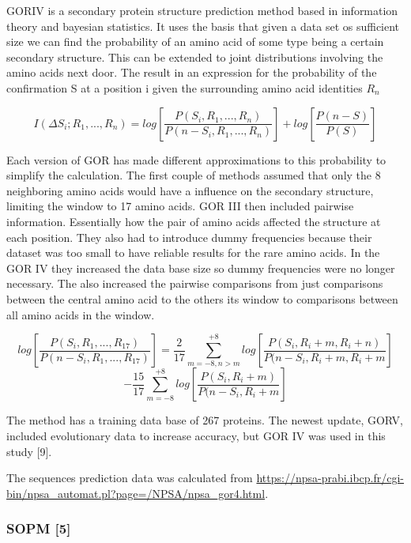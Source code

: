 \documentclass{article}
\begin{document}
GORIV is a secondary protein structure prediction method based in information theory and bayesian statistics. It uses the basis that given a data set os sufficient size we can find the probability of an amino acid of some type being a certain secondary structure. This can be extended to joint distributions involving the amino acids next door. The result in an expression for the probability of the confirmation S at a position i given the surrounding amino acid identities $R_n$

$$I(\Delta S_i ; R_1, ... , R_n) = log[\frac{P(S_i,R_1,...,R_n)}{P(n-S_i,R_1,...,R_n)}] + log[\frac{P(n-S)}{P(S)}]$$

Each version of GOR has made different approximations to this probability to simplify the calculation. The first couple of methods assumed that only the 8 neighboring amino acids would have a influence on the secondary structure, limiting the window to 17 amino acids. GOR III then included pairwise information. Essentially how the pair of amino acids affected the structure at each position. They also had to introduce dummy frequencies because their dataset was too small to have reliable results for the rare amino acids. In the GOR IV they increased the data base size so dummy frequencies were no longer necessary. The also increased the pairwise comparisons from just comparisons between the central amino acid to the others its window to comparisons between all amino acids in the window.

$$log[\frac{P(S_i,R_1,...,R_17)}{P(n-S_i,R_1,...,R_17)}] = \frac{2}{17}  \sum_{m=-8, n>m}^{+8}log[\frac{P(S_i,R_i+m,R_i+n)}{P(n-S_i,R_i+m,R_i+m}] $$
$$ -\frac{15}{17}  \sum_{m=-8}^{+8}log[\frac{P(S_i,R_i+m)}{P(n-S_i,R_i+m}]$$

The method has a training data base of 267 proteins. The newest update, GORV, included evolutionary data to increase accuracy, but GOR IV was used in this study [9].

The sequences prediction data was calculated from \url{https://npsa-prabi.ibcp.fr/cgi-bin/npsa_automat.pl?page=/NPSA/npsa_gor4.html}.

\subsubsection{SOPM [5]}
\end{document}
